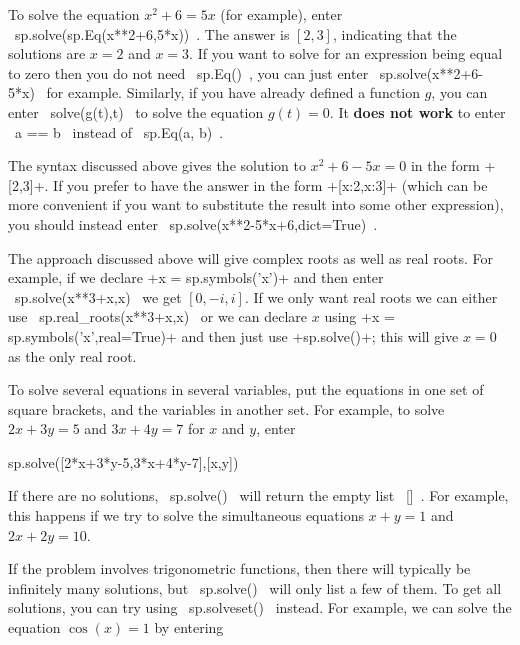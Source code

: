 \documentclass[a4paper,10pt]{amsbook}
\begin{document}
\begin{secenum}
%
 \item\label{solve} To solve the equation $x^2+6=5x$ (for example), enter
  \pcode~sp.solve(sp.Eq(x**2+6,5*x))~.  The answer is $[2,3]$,
  indicating that the solutions are $x=2$ and $x=3$.   
  If you want to solve for an
  expression being equal to zero then you do not need \pcode~sp.Eq()~,
  you can just enter \pcode~sp.solve(x**2+6-5*x)~ for example.  
  Similarly, if you have already defined a function $g$, you can enter
  \pcode~solve(g(t),t)~ to solve the equation $g(t)=0$. It
  \textbf{does not work} to enter \pcode~a == b~ instead of
  \pcode~sp.Eq(a, b)~.  
%
  \item\label{roots}
   The syntax discussed above gives the solution to $x^2+6-5x=0$ in the form
   \pcode+[2,3]+.  If you prefer to have the answer in
   the form \pcode+[{x:2},{x:3}]+ (which can be more convenient if you
   want to substitute the result into some other expression), you
   should instead enter \pcode~sp.solve({x**2-5*x+6},dict=True)~.
%
  \item\label{realroots}
   The approach discussed above will give complex roots as well as real roots.  
   For example, if we declare \pcode+x = sp.symbols('x')+ and then enter 
   \pcode~sp.solve(x**3+x,x)~ we get $[0,-i,i]$.  If we only want real 
   roots we can either use \pcode~sp.real_roots(x**3+x,x)~ or we can
   declare $x$ using \pcode+x = sp.symbols('x',real=True)+ and then
   just use \pcode+sp.solve()+; this will give $x=0$ as the only real root.
%
 \item\label{multisolve} To solve several equations in several variables, put the
  equations in one set of square brackets, and the variables in another
  set.  For example, to solve $2x+3y=5$ and $3x+4y=7$ for $x$ and $y$,
  enter 
\begin{pcodeblock}
 sp.solve([2*x+3*y-5,3*x+4*y-7],[x,y])
\end{pcodeblock}
%
 \item\label{nosols} If there are no solutions, \pcode~sp.solve()~ will
 return the empty list \pcode~[]~.    For example, this happens if we
 try to solve the simultaneous equations $x+y=1$ and $2x+2y=10$. 
%
 \item\label{allsolutions} If the problem involves trigonometric
  functions, then there will typically be infinitely many
  solutions, but \pcode~sp.solve()~ will only list a few of them.  
  To get all solutions, you can try using \pcode~sp.solveset()~
  instead.  For example, we can solve the equation $\cos(x)=1$ by entering

\end{secenum}
\end{document}

